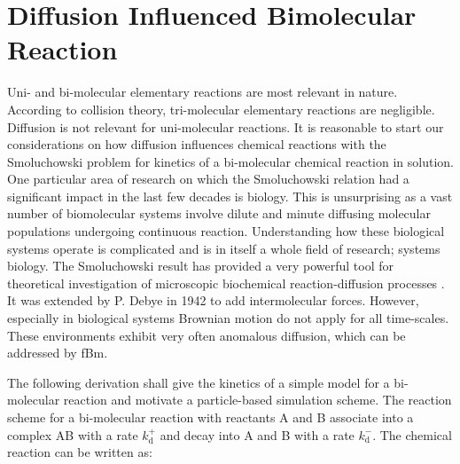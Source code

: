 \documentclass[
  a4paper,BCOR10mm,oneside,
  headsepline,footsepline,%
  fleqn,openbib
]{scrbook}
\begin{document}
% 
% 
% 
% 

\section{Diffusion Influenced Bimolecular Reaction}\label{Erban-chapman-section}
Uni- and bi-molecular elementary reactions are most relevant in nature. According to collision theory, tri-molecular elementary reactions are negligible. Diffusion is not relevant for uni-molecular reactions. It is reasonable to start our considerations on how diffusion influences chemical reactions with the Smoluchowski problem for kinetics of a bi-molecular chemical reaction in solution. One particular area of research on which the Smoluchowski relation had a significant impact in the last few decades is biology. This is unsurprising as a vast number of biomolecular systems involve dilute and minute diffusing molecular populations undergoing continuous reaction. Understanding how these biological systems operate is complicated and is in itself a whole field of research; systems biology. The Smoluchowski result has provided a very powerful tool for theoretical investigation of microscopic biochemical reaction-diffusion processes \cite{Flegg}. It was extended by P. Debye in 1942 to add intermolecular forces. However, especially in biological systems Brownian motion do not apply for all time-scales. These environments exhibit very often anomalous diffusion, which can be addressed by fBm. 
\par
The following derivation shall give the kinetics of a simple model for a bi-molecular reaction and motivate a particle-based simulation scheme.
The reaction scheme for a bi-molecular reaction with reactants A and B associate into a complex AB with a rate $k^{+}_{\mathrm{d}}$ and decay into A and B with a rate $k^{-}_{\mathrm{d}}$. The chemical reaction can be written as:
\end{document}
